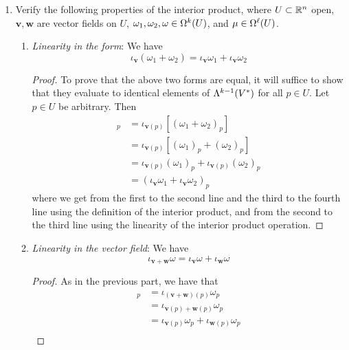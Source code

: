 \documentclass[../psets.tex]{subfiles}
\begin{document}
\begin{enumerate}[label={\textbf{2.5.\roman*.}}]
    \item Verify the following properties of the interior product, where $U\subset\R^n$ open, $\bm{v},\bm{w}$ are vector fields on $U$, $\omega_1,\omega_2,\omega\in\ome[k]{U}$, and $\mu\in\ome[\ell]{U}$.
    \begin{enumerate}
        \item \emph{Linearity in the form}: We have
        \begin{equation*}
            \iota_{\bm{v}}(\omega_1+\omega_2) = \iota_{\bm{v}}\omega_1+\iota_{\bm{v}}\omega_2
        \end{equation*}
        \begin{proof}
            To prove that the above two forms are equal, it will suffice to show that they evaluate to identical elements of $\lam[k-1]{V^*}$ for all $p\in U$. Let $p\in U$ be arbitrary. Then
            \begin{align*}
                [\iota_{\bm{v}}(\omega_1+\omega_2)]_p &= \iota_{\bm{v}(p)}[(\omega_1+\omega_2)_p]\\
                &= \iota_{\bm{v}(p)}[(\omega_1)_p+(\omega_2)_p]\\
                &= \iota_{\bm{v}(p)}(\omega_1)_p+\iota_{\bm{v}(p)}(\omega_2)_p\\
                &= (\iota_{\bm{v}}\omega_1+\iota_{\bm{v}}\omega_2)_p
            \end{align*}
            where we get from the first to the second line and the third to the fourth line using the definition of the interior product, and from the second to the third line using the linearity of the interior product operation.
        \end{proof}
        \item \emph{Linearity in the vector field}: We have
        \begin{equation*}
            \iota_{\bm{v}+\bm{w}}\omega = \iota_{\bm{v}}\omega+\iota_{\bm{w}}\omega
        \end{equation*}
        \begin{proof}
            As in the previous part, we have that
            \begin{align*}
                [\iota_{\bm{v}+\bm{w}}\omega]_p &= \iota_{(\bm{v}+\bm{w})(p)}\omega_p\\
                &= \iota_{\bm{v}(p)+\bm{w}(p)}\omega_p\\
                &= \iota_{\bm{v}(p)}\omega_p+\iota_{\bm{w}(p)}\omega_p\\

\end{align*}
\end{proof}
\end{enumerate}
\end{enumerate}
\end{document}
